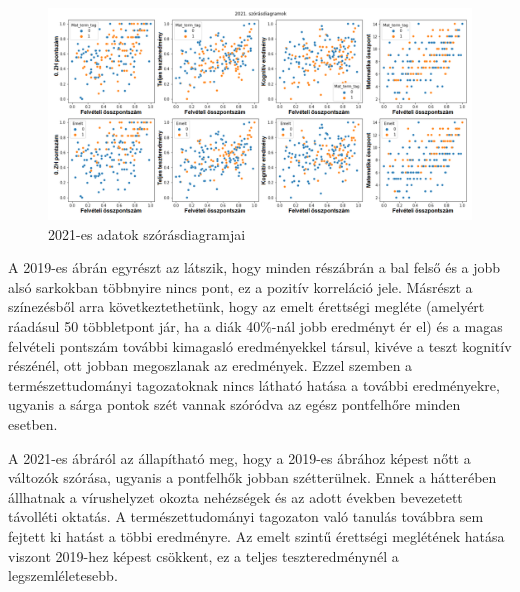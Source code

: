 \documentclass[12pt]{article}
\begin{document}
\begin{figure}[H]
\centering
\includegraphics[width=\textwidth]{kepek/2021scatter.png}
\caption{2021-es adatok szórásdiagramjai}
\label{fig:2021scatter}
\end{figure}

A 2019-es ábrán egyrészt az látszik, hogy minden részábrán a bal felső és a jobb alsó sarkokban többnyire nincs pont, ez a pozitív korreláció jele. Másrészt a színezésből arra következtethetünk, hogy az emelt érettségi megléte (amelyért ráadásul 50 többletpont jár, ha a diák 40\%-nál jobb eredményt ér el) és a magas felvételi pontszám további kimagasló eredményekkel társul, kivéve a teszt kognitív részénél, ott jobban megoszlanak az eredmények. Ezzel szemben a természettudományi tagozatoknak nincs látható hatása a további eredményekre, ugyanis a sárga pontok szét vannak szóródva az egész pontfelhőre minden esetben.

A 2021-es ábráról az állapítható meg, hogy a 2019-es ábrához képest nőtt a változók szórása, ugyanis a pontfelhők jobban szétterülnek. Ennek a hátterében állhatnak a vírushelyzet okozta nehézségek és az adott években bevezetett távolléti oktatás. A természettudományi tagozaton való tanulás továbbra sem fejtett ki hatást a többi eredményre. Az emelt szintű érettségi meglétének hatása viszont 2019-hez képest csökkent, ez a teljes teszteredménynél a legszemléletesebb.
\end{document}
